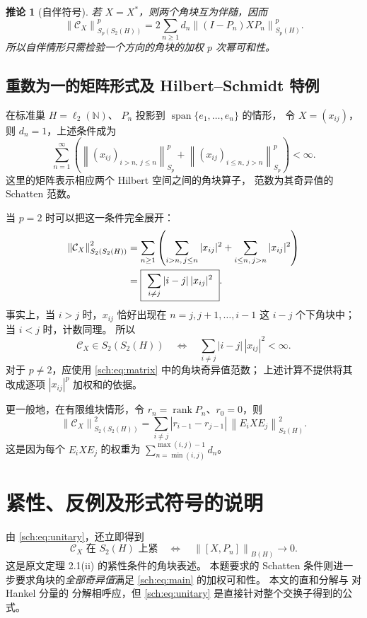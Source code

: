 \documentclass[UTF8,11pt,a4paper,fontset=fandol]{ctexart}
\newtheorem{corollary}[theorem]{推论}
\theoremstyle{remark}
\newcommand{\CC}{\mathcal C}
\newcommand{\norm}[1]{\left\lVert #1\right\rVert}
\DeclareMathOperator{\rank}{rank}
\numberwithin{equation}{section}
\begin{document}
\begin{corollary}[自伴符号]
若 $X=X^*$，则两个角块互为伴随，因而
\[
 \norm{\CC_X}_{S_p(S_2(H))}^p
 =2\sum_{n\geq1}d_n\norm{(I-P_n)XP_n}_{S_p(H)}^p.
\]
所以自伴情形只需检验一个方向的角块的加权 $p$ 次幂可和性。
\end{corollary}

\subsection{重数为一的矩阵形式及 Hilbert--Schmidt 特例}

在标准巢 $H=\ell_2(\mathbb N)$、
$P_n$ 投影到 $\operatorname{span}\{e_1,\ldots,e_n\}$ 的情形，
令 $X=(x_{ij})$，则 $d_n=1$，上述条件成为
\begin{equation}\label{sch:eq:matrix}
 \sum_{n=1}^{\infty}\left(
  \norm{(x_{ij})_{i>n,\,j\leq n}}_{S_p}^p
  +\norm{(x_{ij})_{i\leq n,\,j>n}}_{S_p}^p
 \right)<\infty.
\end{equation}
这里的矩阵表示相应两个 Hilbert 空间之间的角块算子，
范数为其奇异值的 Schatten 范数。

当 $p=2$ 时可以把这一条件完全展开：
\begin{align}
 \norm{\CC_X}_{S_2(S_2(H))}^2
 &=\sum_{n\geq1}\left(
   \sum_{i>n,\,j\leq n}|x_{ij}|^2
   +\sum_{i\leq n,\,j>n}|x_{ij}|^2\right)\notag\\
 &=\boxed{\ \sum_{i\ne j}|i-j|\,|x_{ij}|^2\ }.\label{sch:eq:hs}
\end{align}
事实上，当 $i>j$ 时，$x_{ij}$ 恰好出现在 $n=j,j+1,\ldots,i-1$
这 $i-j$ 个下角块中；当 $i<j$ 时，计数同理。
所以
\[
 \CC_X\in S_2(S_2(H))
 \quad\Longleftrightarrow\quad
 \sum_{i\ne j}|i-j|\,|x_{ij}|^2<\infty.
\]
对于 $p\ne2$，应使用 \eqref{sch:eq:matrix} 中的角块奇异值范数；
上述计算不提供将其改成逐项 $|x_{ij}|^p$ 加权和的依据。

更一般地，在有限维块情形，令 $r_n=\rank P_n$、$r_0=0$，则
\begin{equation}\label{sch:eq:blockhs}
 \norm{\CC_X}_{S_2(S_2(H))}^2
 =\sum_{i\ne j}|r_{i-1}-r_{j-1}|\,
   \norm{E_iXE_j}_{S_2(H)}^2.
\end{equation}
这是因为每个 $E_iXE_j$ 的权重为
$\sum_{n=\min(i,j)}^{\max(i,j)-1}d_n$。

\section{紧性、反例及形式符号的说明}\label{sec:compact}

由 \eqref{sch:eq:unitary}，还立即得到
\[
 \CC_X\text{ 在 }S_2(H)\text{ 上紧}
 \quad\Longleftrightarrow\quad
 \norm{[X,P_n]}_{B(H)}\longrightarrow0.
\]
这是原文定理 2.1(ii) 的紧性条件的角块表述。
本题要求的 Schatten 条件则进一步要求角块的\emph{全部奇异值}满足
\eqref{sch:eq:main} 的加权可和性。
本文的直和分解与 \cite[p.~279, Remark (2)]{Power} 对 Hankel 分量的
分解相呼应，但 \eqref{sch:eq:unitary} 是直接针对整个交换子得到的公式。
\end{document}
